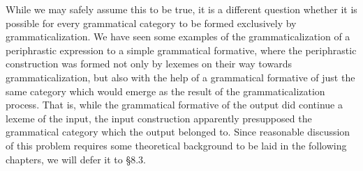 While we may safely assume this to be true, it is a different question whether it is possible for every grammatical category to be formed exclusively by grammaticalization. We have seen some examples of the grammaticalization of a periphrastic expression to a simple grammatical formative, where the periphrastic construction was formed not only by lexemes on their way towards grammaticalization, but also with the help of a grammatical formative of just the same category which would emerge as the result of the grammaticalization process. That is, while the grammatical formative of the output did continue a lexeme of the input, the input construction apparently presupposed the grammatical category which the output belonged to. Since reasonable discussion of this problem requires some theoretical background to be laid in the following chapters, we will defer it to §8.3.

